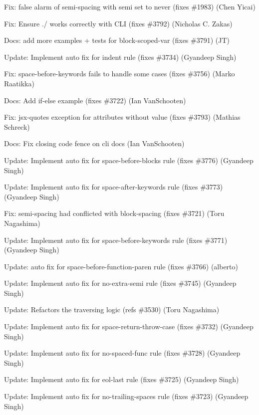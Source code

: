 \begin{DoxyItemize}
$$\item Fix\+: false alarm of semi-\/spacing with semi set to never (fixes \#1983) (Chen Yicai)
\item Fix\+: Ensure ./ works correctly with C\+LI (fixes \#3792) (Nicholas C. Zakas)
\item Docs\+: add more examples + tests for block-\/scoped-\/var (fixes \#3791) (JT)
\item Update\+: Implement auto fix for {\ttfamily indent} rule (fixes \#3734) (Gyandeep Singh)
\item Fix\+: {\ttfamily space-\/before-\/keywords} fails to handle some cases (fixes \#3756) (Marko Raatikka)
\item Docs\+: Add if-\/else example (fixes \#3722) (Ian Van\+Schooten)
\item Fix\+: jsx-\/quotes exception for attributes without value (fixes \#3793) (Mathias Schreck)
\item Docs\+: Fix closing code fence on cli docs (Ian Van\+Schooten)
\item Update\+: Implement auto fix for {\ttfamily space-\/before-\/blocks} rule (fixes \#3776) (Gyandeep Singh)
\item Update\+: Implement auto fix for {\ttfamily space-\/after-\/keywords} rule (fixes \#3773) (Gyandeep Singh)
\item Fix\+: {\ttfamily semi-\/spacing} had conflicted with {\ttfamily block-\/spacing} (fixes \#3721) (Toru Nagashima)
\item Update\+: Implement auto fix for {\ttfamily space-\/before-\/keywords} rule (fixes \#3771) (Gyandeep Singh)
\item Update\+: auto fix for space-\/before-\/function-\/paren rule (fixes \#3766) (alberto)
\item Update\+: Implement auto fix for {\ttfamily no-\/extra-\/semi} rule (fixes \#3745) (Gyandeep Singh)
\item Update\+: Refactors the traversing logic (refs \#3530) (Toru Nagashima)
\item Update\+: Implement auto fix for {\ttfamily space-\/return-\/throw-\/case} (fixes \#3732) (Gyandeep Singh)
\item Update\+: Implement auto fix for {\ttfamily no-\/spaced-\/func} rule (fixes \#3728) (Gyandeep Singh)
\item Update\+: Implement auto fix for {\ttfamily eol-\/last} rule (fixes \#3725) (Gyandeep Singh)
\item Update\+: Implement auto fix for {\ttfamily no-\/trailing-\/spaces} rule (fixes \#3723) (Gyandeep Singh)
\end{DoxyItemize}

